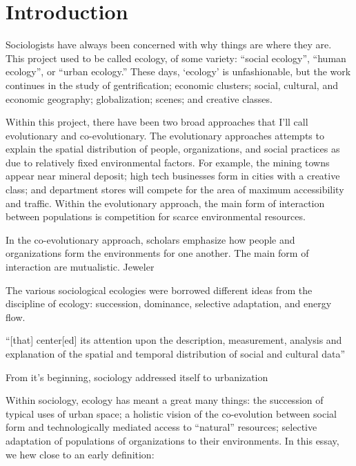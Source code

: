 \documentclass[12pt,draft,letter]{article}
\begin{document}
\section{Introduction}
Sociologists have always been concerned with why things are where they
are. This project used to be called ecology, of some variety: ``social
ecology'', ``human ecology'', or ``urban ecology.'' These days,
`ecology' is unfashionable, but the work continues in the study of
gentrification; economic clusters; social, cultural, and economic
geography; globalization; scenes; and creative classes.

Within this project, there have been two broad approaches that I'll
call evolutionary and co-evolutionary. The evolutionary approaches
attempts to explain the spatial distribution of people, organizations,
and social practices as due to relatively fixed environmental
factors. For example, the mining towns appear near mineral deposit;
high tech businesses form in cities with a creative class; and
department stores will compete for the area of maximum accessibility
and traffic. Within the evolutionary approach, the main form of
interaction between populations is competition for scarce
environmental resources.

In the co-evolutionary approach, scholars emphasize how people and
organizations form the environments for one another. The main form of
interaction are mutualistic. Jeweler



The various sociological ecologies were borrowed different ideas from the
discipline of ecology: succession, dominance, selective adaptation,
and energy flow. 



``[that] center[ed] its attention upon the description, measurement,
analysis and explanation of the spatial and temporal distribution of
social and cultural data''



From it's beginning, sociology addressed itself to urbanization 


Within sociology, ecology has meant a great many things: the
succession of typical uses of urban space; a holistic vision of the
co-evolution between social form and technologically mediated access
to ``natural'' resources; selective adaptation of populations of
organizations to their environments. In this essay, we hew close to an
early definition:
\end{document}
